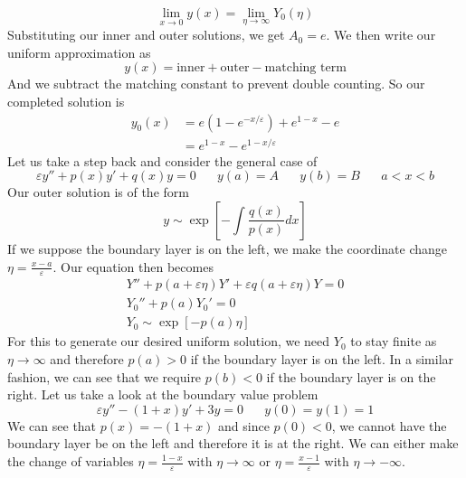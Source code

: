 \documentclass{article}
\newcommand{\twen}{\hspace{20pt}}
\begin{document}
\begin{equation*}
    \lim_{x\to 0}y(x) = \lim_{\eta \to \infty} Y_0(\eta) 
\end{equation*}
Substituting our inner and outer solutions, we get $A_0 =e$. We then write our uniform approximation as 
\begin{equation*}
    y(x)=\text{inner}+\text{outer} - \text{matching term}
\end{equation*}
And we subtract the matching constant to prevent double counting. So our completed solution is 
\begin{equation*}
    \begin{split}
        y_0(x)&=e(1-e^{-x/\varepsilon})+e^{1-x}-e\\
        &=e^{1-x}-e^{1-x/\varepsilon}
    \end{split}
\end{equation*}
Let us take a step back and consider the general case of 
\begin{equation*}
    \varepsilon y''+p(x)y'+q(x)y=0 \twen y(a)=A\twen y(b)=B \twen a<x<b
\end{equation*}
Our outer solution is of the form 
\begin{equation*}
    y\sim \exp\left[-\int \frac{q(x)}{p(x)}dx \right]
\end{equation*}
If we suppose the boundary layer is on the left, we make the coordinate change $\eta=\frac{x-a}{\varepsilon}$. Our equation then becomes 
\begin{equation*}
    \begin{split}
        Y''+p(a+\varepsilon\eta)Y'+\varepsilon q(a+\varepsilon\eta)Y=0  \\
        Y_0''+p(a)Y_0'=0 \\
        Y_0\sim\exp[-p(a)\eta]
    \end{split}
\end{equation*}
For this to generate our desired uniform solution, we need $Y_0$ to stay finite as $\eta \rightarrow \infty$ and therefore $p(a)>0$ if the boundary layer is on the left. In a similar fashion, we can see that we require $p(b) <0$ if the boundary layer is on the right. Let us take a look at the boundary value problem 
\begin{equation*}
    \varepsilon y''-(1+x)y'+3y =0 \twen y(0)=y(1)=1
\end{equation*}
We can see that $p(x)=-(1+x)$ and since $p(0)<0$, we cannot have the boundary layer be on the left and therefore it is at the right. We can either make the change of variables $\eta =\frac{1-x}{\varepsilon}$ with $\eta \to \infty $ or $\eta =\frac{x-1}{\varepsilon}$ with $\eta \rightarrow -\infty$.
\end{document}
